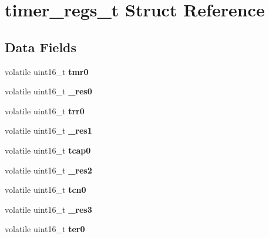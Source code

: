 \hypertarget{structtimer__regs__t}{}\section{timer\+\_\+regs\+\_\+t Struct Reference}
\label{structtimer__regs__t}
\subsection*{Data Fields}
\begin{DoxyCompactItemize}
\item 
\mbox{\label{structtimer__regs__t_a4bf96f076082cf7099a372a0567daa31}} 
volatile uint16\+\_\+t {\bfseries tmr0}
\item 
\mbox{\label{structtimer__regs__t_a0f08e81d4540effae84e2c38e9f6cd37}} 
volatile uint16\+\_\+t {\bfseries \+\_\+res0}
\item 
\mbox{\label{structtimer__regs__t_ab3a19a5c30b116176b3e90d3ace17c40}} 
volatile uint16\+\_\+t {\bfseries trr0}
\item 
\mbox{\label{structtimer__regs__t_af53a76aa52a1d5594efa5206aa857798}} 
volatile uint16\+\_\+t {\bfseries \+\_\+res1}
\item 
\mbox{\label{structtimer__regs__t_a205121c8c16d70f165d7fc9fbaaef73e}} 
volatile uint16\+\_\+t {\bfseries tcap0}
\item 
\mbox{\label{structtimer__regs__t_a8a61a12358dbe91caaaee53f7593ae93}} 
volatile uint16\+\_\+t {\bfseries \+\_\+res2}
\item 
\mbox{\label{structtimer__regs__t_a46b09e9ec1582913b6ae6a7ce5b4f0db}} 
volatile uint16\+\_\+t {\bfseries tcn0}
\item 
\mbox{\label{structtimer__regs__t_a8e83bc9be0efd55017102f78a1e03ee6}} 
volatile uint16\+\_\+t {\bfseries \+\_\+res3}
\item 
\mbox{\label{structtimer__regs__t_a32246aafe5301a2507ed15a45bf5f2d3}} 
volatile uint16\+\_\+t {\bfseries ter0}

\end{DoxyCompactItemize}

